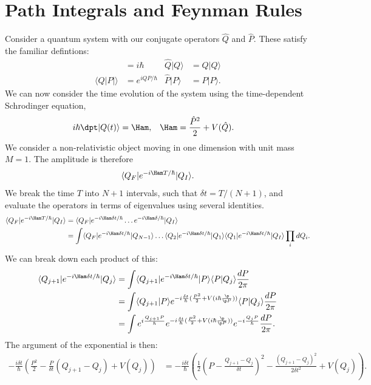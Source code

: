 \documentclass[relqm.tex]{subfiles}
\begin{document}
\chapter{Path Integrals and Feynman Rules}
Consider a quantum system with our conjugate operators $\hat{Q}$ and $\hat{P}$. 
These satisfy the familiar defintions:
\begin{align}
    [\hat{Q},\hat{P}] &= i\hbar & \hat{Q}|Q\rangle &= Q|Q\rangle \\
    \langle Q|P|\rangle &= e^{iQP/\hbar} & \hat{P}|P\rangle &= P|P\rangle.
\end{align}
We can now consider the time evolution of the system using the time-dependent Schrodinger equation,
\begin{align}
    i\hbar\dpt|Q(t)\rangle &= \Ham, & \Ham &= \frac{\hat{P}^2}{2} + V(\hat{Q}).
\end{align}
We consider a non-relativistic object moving in one dimension with unit mass $M=1$.
The amplitude is therefore
\begin{align}
    \langle Q_F|e^{-i\Ham T/\hbar}|Q_I\rangle.
\end{align}
We break the time $T$ into $N+1$ intervals, such that $\delta t = T/(N+1)$, and evaluate the operators in terms of eigenvalues using several identities. 
\begin{align}
    \langle Q_F|e^{-i\Ham T/\hbar}|Q_I\rangle &= \langle Q_F|e^{-i\Ham \delta t/\hbar}\dots e^{-i\Ham \delta/\hbar}|Q_I\rangle \\
                                              &= \int \langle Q_F|e^{-i\Ham \delta t/\hbar}|Q_{N-1}\rangle\dots\langle Q_2|e^{-i\Ham\delta t/\hbar}|Q_1\rangle\langle Q_1|e^{-i\Ham\delta t/\hbar}|Q_I\rangle\prod_i dQ_i.
\end{align}
We can break down each product of this:
\begin{align}
    \langle Q_{j+1}|e^{-i\Ham\delta t/\hbar}|Q_j\rangle &= \int \langle Q_{j+1}|e^{-i\Ham\delta t/\hbar}|P\rangle\langle P|Q_j\rangle\frac{dP}{2\pi} \\
                                                        &= \int \langle Q_{j+1}|P\rangle e^{-i\frac{\delta t}{\hbar}(\frac{P^2}{2}+V(i\hbar\frac{\p}{\p P}))}\langle P|Q_j\rangle\frac{dP}{2\pi} \\
    &= \int e^{i\frac{Q_{j+1}P}{\hbar}}e^{-i\frac{\delta t}{\hbar}(\frac{P^2}{2}+V(i\hbar\frac{\p}{\p P}))}e^{-i\frac{Q_jP}{\hbar}}\frac{dP}{2\pi}.
\end{align}
The argument of the exponential is then:
\begin{align}
    -\frac{i\delta t}{\hbar}\left(\frac{P^2}{2}-\frac{P}{\delta t}(Q_{j+1}-Q_j)+V(Q_j)\right) &= -\frac{i\delta t}{\hbar}\left(\frac12\left(P - \frac{Q_{j+1}-Q_j}{\delta t}\right)^2 - \frac{(Q_{j+1}-Q_j)^2}{2\delta t^2} + V(Q_j)\right).
\end{align}
\end{document}
